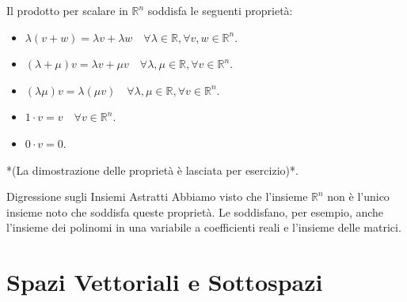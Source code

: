 \documentclass[11pt,a4paper]{article}
\begin{document}
Il prodotto per scalare in $\mathbb{R}^n$ soddisfa le seguenti proprietà:
\begin{itemize}
    \item $\lambda(v + w) = \lambda v + \lambda w \quad \forall \lambda \in \mathbb{R}, \forall v, w \in \mathbb{R}^n$.
    \item $(\lambda + \mu)v = \lambda v + \mu v \quad \forall \lambda, \mu \in \mathbb{R}, \forall v \in \mathbb{R}^n$.
    \item $(\lambda \mu)v = \lambda(\mu v) \quad \forall \lambda, \mu \in \mathbb{R}, \forall v \in \mathbb{R}^n$.
    \item $1 \cdot v = v \quad \forall v \in \mathbb{R}^n$.
    \item $0 \cdot v = 0$.
\end{itemize}
*(La dimostrazione delle proprietà è lasciata per esercizio)*.

\begin{concept}{Digressione sugli Insiemi Astratti}{}
Abbiamo visto che l'insieme $\mathbb{R}^n$ non è l'unico insieme noto che soddisfa queste proprietà. Le soddisfano, per esempio, anche l'insieme dei polinomi in una variabile a coefficienti reali e l'insieme delle matrici.
\end{concept}

\newpage
\section{Spazi Vettoriali e Sottospazi}
\end{document}
